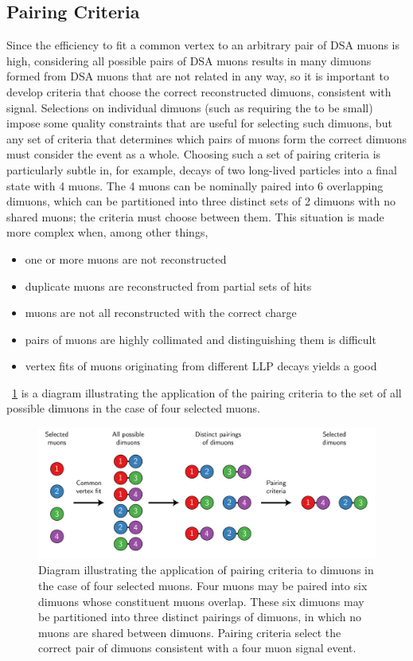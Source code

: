 \subsection{Pairing Criteria}
\label{sec:dd:pc}
Since the efficiency to fit a common vertex to an arbitrary pair of DSA muons is high, considering all possible pairs of DSA muons results in many dimuons formed from DSA muons that are not related in any way, so it is important to develop criteria that choose the correct reconstructed dimuons, consistent with signal.
Selections on individual dimuons (such as requiring the \vchisq to be small) impose some quality constraints that are useful for selecting such dimuons, but any set of criteria that determines which pairs of muons form the correct dimuons must consider the event as a whole.
Choosing such a set of pairing criteria is particularly subtle in, for example, decays of two long-lived particles into a final state with 4 muons.
The 4 muons can be nominally paired into 6 overlapping dimuons, which can be partitioned into three distinct sets of 2 dimuons with no shared muons; the criteria must choose between them.
This situation is made more complex when, among other things,
\begin{itemize}
  \item one or more muons are not reconstructed
  \item duplicate muons are reconstructed from partial sets of hits
  \item muons are not all reconstructed with the correct charge
  \item pairs of muons are highly collimated and distinguishing them is difficult
  \item vertex fits of muons originating from different LLP decays yields a good \vchisq
\end{itemize}
\Fig~\ref{fig:dd:pc} is a diagram illustrating the application of the pairing criteria to the set of all possible dimuons in the case of four selected muons.

\begin{figure}[htpb]
  \centering
  \includegraphics[width=\textwidth]{figures/displaced/PairingCriteriaDiagram.pdf}
  \caption{Diagram illustrating the application of pairing criteria to dimuons in the case of four selected muons. Four muons may be paired into six dimuons whose constituent muons overlap. These six dimuons may be partitioned into three distinct pairings of dimuons, in which no muons are shared between dimuons. Pairing criteria select the correct pair of dimuons consistent with a four muon signal event.}
  \label{fig:dd:pc}
\end{figure}

